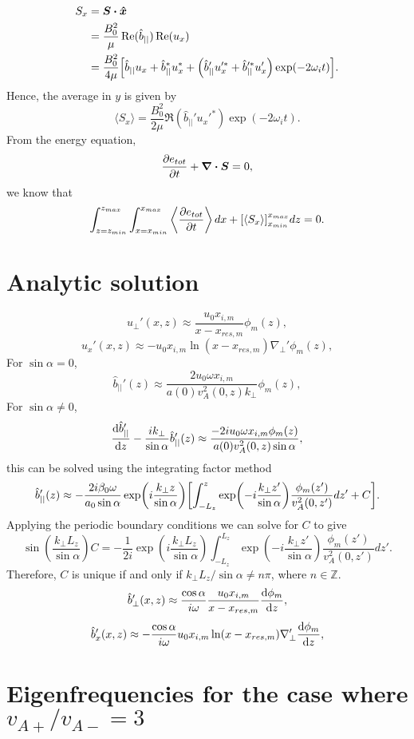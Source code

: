 \documentclass{article}
\let\vec\boldsymbol
\begin{document}
\[\begin{aligned}
    S_x &= \vec{S}\vdot\vec{\hat{x}} \\
    &= \frac{B_0^2}{\mu}\Re(\hat{b}_{||})\Re(u_x) \\
    &= \frac{B_0^2}{4\mu}\qty[\hat{b}_{||}u_x+\hat{b}_{||}^*u_x^* + \qty(\hat{b}_{||}'u_x'^*+\hat{b}_{||}'^*u_x')\exp(-2\omega_i t)]. \\
\end{aligned}\]
Hence, the average in $y$ is given by
\[\langle S_x \rangle = \frac{B_0^2}{2\mu}\Re(\hat{b}_{||}'u_x'^*)\exp(-2\omega_i t).\]
From the energy equation,
\[\pdv{e_{tot}}{t} + \div{\vec{S}} = 0,\]
we know that
\[\int_{z=z_{min}}^{z_{max}} \int_{x=x_{min}}^{x_{max}}\left\langle \pdv{e_{tot}}{t} \right\rangle dx + \qty[\langle S_x \rangle]_{x_{min}}^{x_{max}} dz= 0.\]

\section*{Analytic solution}

\[ u_\perp'(x,z) \approx \frac{u_0 x_{i,m}}{x - x_{res,m}}\phi_m(z),\]
\[ u_x'(x,z) \approx -u_0x_{i,m}\ln(x-x_{res,m})\nabla_\perp'\phi_m(z),\]
For $\sin\alpha = 0$,
\[\hat{b}_{||}'(z) \approx \frac{2u_0\omega x_{i,m}}{a(0)v_A^2(0,z)k_\perp}\phi_m(z),\]
For $\sin\alpha\ne0$,
\[\dv{\hat{b}_{||}'}{z} - \frac{ik_\perp}{\sin\alpha}\hat{b}_{||}'(z) \approx \frac{-2iu_0\omega x_{i,m}\phi_m(z)}{a(0)v_A^2(0,z)\sin\alpha},\]
this can be solved using the integrating factor method
\[\hat{b}_{||}'(z) \approx -\frac{2i\beta_0\omega}{a_0\sin\alpha}\exp(i\frac{k_\perp z}{\sin\alpha}) \qty[\int_{-L_z}^z\exp(-i\frac{k_\perp z'}{\sin\alpha})\frac{\phi_m(z')}{v_A^2(0,z')}dz'+C].\]
Applying the periodic boundary conditions we can solve for $C$ to give
\[\sin(\frac{k_\perp L_z}{\sin\alpha})C = -\frac{1}{2i}\exp(i\frac{k_\perp L_z}{\sin\alpha})\int_{-L_z}^{L_z}\exp(-i\frac{k_\perp z'}{\sin\alpha})\frac{\phi_m(z')}{v_A^2(0,z')}dz'.\]
Therefore, $C$ is unique if and only if $k_\perp L_z / \sin\alpha \ne n\pi$, where $n\in\mathds{Z}$.
\[\hat{b}_\perp'(x,z) \approx \frac{\cos\alpha}{i\omega}\frac{u_0 x_{i,m}}{x - x_{res,m}}\dv{\phi_m}{z},\]
\[\hat{b}_x'(x,z) \approx -\frac{\cos\alpha}{i\omega}u_0x_{i,m}\ln(x-x_{res,m})\nabla_\perp'\dv{\phi_m}{z},\]

\section*{Eigenfrequencies for the case where $v_{A+} / v_{A-} = 3$}
\end{document}
